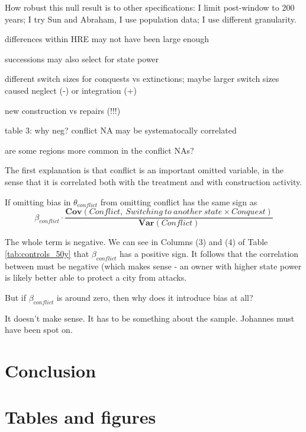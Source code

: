 \documentclass[11pt, a4paper]{article}
\begin{document}
How robust this null result is to other specifications: I limit post-window to 200 years; I try Sun and Abraham, I use population data; I use different granularity.

differences within HRE may not have been large enough

successions may also select for state power

different switch sizes for conquests vs extinctions; maybe larger switch sizes caused neglect (-) or integration (+)

new construction vs repairs (!!!)



table 3: why neg? conflict NA may be systematocally correlated

are some regions more common in the conflict NAs?

The first explanation is that conflict is an important omitted variable, in the sense that it is correlated both with the treatment and with construction activity.

If omitting  bias in $\theta_{conflict}$ from omitting conflict has the same sign as 
$$\beta_{conflict} \cdot \frac{\mathbf{Cov}({Conflict},\: {Switching\: to\: another\: state \times Conquest})}{\mathbf{Var}(Conflict)}$$

The whole term is negative. We can see in Columns (3) and (4) of Table \ref{tab:controls_50y} that $\beta_{conflict}$ has a positive sign. It follows that the correlation between must be negative (which makes sense - an owner with higher state power is likely better able to protect a city from attacks.

But if $\beta_{conflict}$ is around zero, then why does it introduce bias at all?





It doesn't make sense. It has to be something about the sample. Johannes must have been spot on.




\section{Conclusion} \label{sec:conclusion}

\newpage
\onehalfspacing



\newpage
\section*{Tables and figures}
\end{document}
